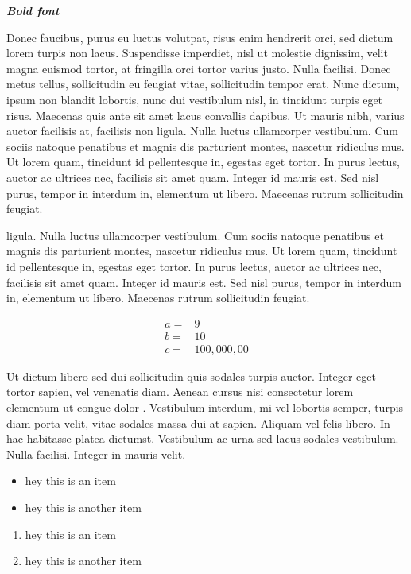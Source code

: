 \textbf{\emph{Bold font}}

Donec faucibus, purus eu luctus volutpat, risus enim hendrerit orci, sed
dictum lorem turpis non lacus. Suspendisse imperdiet, nisl ut molestie
dignissim, velit magna euismod tortor, at fringilla orci tortor varius
justo. Nulla facilisi. Donec metus tellus, sollicitudin eu feugiat
vitae, sollicitudin tempor erat. Nunc dictum, ipsum non blandit
lobortis, nunc dui vestibulum nisl, in tincidunt turpis eget risus.
Maecenas quis ante sit amet lacus convallis dapibus. Ut mauris nibh,
varius auctor facilisis at, facilisis non ligula. Nulla luctus
ullamcorper vestibulum. Cum sociis natoque penatibus et magnis dis
parturient montes, nascetur ridiculus mus. Ut lorem quam, tincidunt id
pellentesque in, egestas eget tortor. In purus lectus, auctor ac
ultrices nec, facilisis sit amet quam. Integer id mauris est. Sed nisl
purus, tempor in interdum in, elementum ut libero. Maecenas rutrum
sollicitudin feugiat.

ligula. Nulla luctus ullamcorper vestibulum. Cum sociis natoque
penatibus et magnis dis parturient montes, nascetur ridiculus mus. Ut
lorem quam, tincidunt id pellentesque in, egestas eget tortor. In purus
lectus, auctor ac ultrices nec, facilisis sit amet quam. Integer id
mauris est. Sed nisl purus, tempor in interdum in, elementum ut libero.
Maecenas rutrum sollicitudin feugiat.

\begin{align*}
a =& 9 \\
b =& 10 \\
c =& 100,000,00
\end{align*}

Ut dictum libero sed dui sollicitudin quis sodales turpis auctor.
Integer eget tortor sapien, vel venenatis diam. Aenean cursus nisi
consectetur lorem elementum ut congue dolor . Vestibulum interdum, mi
vel lobortis semper, turpis diam porta velit, vitae sodales massa dui at
sapien. Aliquam vel felis libero. In hac habitasse platea dictumst.
Vestibulum ac urna sed lacus sodales vestibulum. Nulla facilisi. Integer
in mauris velit.

\begin{itemize}
\item
  hey this is an item
\item
  hey this is another item
\end{itemize}

\begin{enumerate}
\item
  hey this is an item
\item
  hey this is another item
\end{enumerate}

